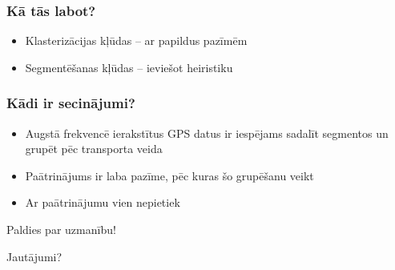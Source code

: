 \documentclass[xelatex,mathserif,serif]{beamer}
\newlength{\wideitemsep}
\let\olditem\item
\renewcommand{\item}{\setlength{\itemsep}{\wideitemsep}\olditem}
\begin{document}
\begin{frame}
  \frametitle{Kā tās labot?}
  \begin{itemize}
    \item Klasterizācijas kļūdas – ar papildus pazīmēm
    \item Segmentēšanas kļūdas – ieviešot heiristiku
  \end{itemize}
\end{frame}

\begin{frame}
  \frametitle{Kādi ir secinājumi?}
  \begin{itemize}
    \item Augstā frekvencē ierakstītus GPS datus ir iespējams sadalīt segmentos un grupēt
      pēc transporta veida
    \item Paātrinājums ir laba pazīme, pēc kuras šo grupēšanu veikt
    \item Ar paātrinājumu vien nepietiek
  \end{itemize}
\end{frame}

\begin{frame}
  \fontsize{20pt}{0}\selectfont
  \centerline{Paldies par uzmanību!}
  \fontsize{14pt}{0}\selectfont
  \centerline{Jautājumi?}
\end{frame}
\end{document}
